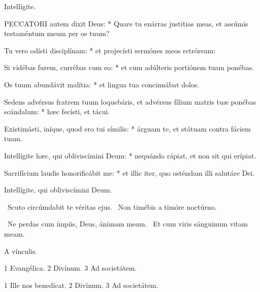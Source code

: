  Intellígite.


\lettrine[lines=2]{P}{ECCATORI} autem dixit Deus: * Quare tu enárras justítias meas, et assúmis testaméntum meum per os tuum?

Tu vero odísti disciplínam: * et projecísti sermónes meos retrórsum:

Si vidébas furem, currébas cum eo: * et cum adúlteris portiónem tuam ponébas.

Os tuum abundávit malítia: * et lingua tua concinnábat dolos.

Sedens advérsus fratrem tuum loquebáris, et advérsus fílium matris tuæ ponébas scándalum: * hæc fecísti, et tácui.

Existimásti, iníque, quod ero tui símilis: * árguam te, et státuam contra fáciem tuam.

Intellígite hæc, qui obliviscímini Deum: * nequándo rápiat, et non sit qui erípiat.

Sacrifícium laudis honorificábit me: * et illic iter, quo osténdam illi salutáre Dei.

 Intellígite, qui obliviscímini Deum.


\V\ Scuto circúmdabit te véritas ejus. \R\ Non timébis a timóre noctúrno.


\V\ Ne perdas cum ímpiis, Deus, ánimam meam. \R\ Et cum viris sánguinum vitam meam.

 A vínculis.


 1 Evangélica. 2 Divínum. 3 Ad societátem.


 1 Ille nos benedícat. 2 Divínum. 3 Ad societátem.

\sectionornament


